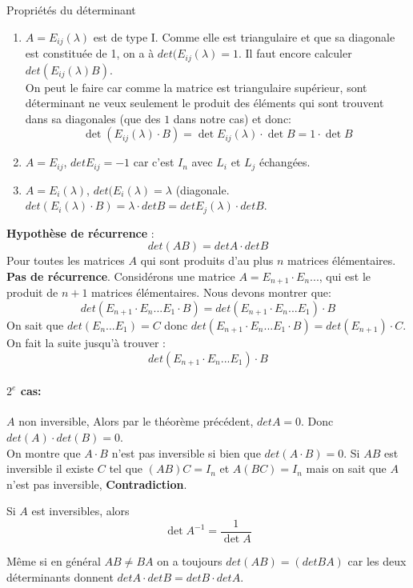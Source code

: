 \begin{parag}{Propriétés du déterminant}
\begin{preuve}
\begin{itemize}
        \end{itemize}
    \end{preuve}
    \begin{enumerate}
        \item $A = E_{ij}(\lambda)$ est de type I. Comme elle est triangulaire et que sa diagonale est constituée de 1, on a à $det(E_{ij}(\lambda) = 1$. Il faut encore calculer $det(E_{ij}(\lambda)B)$. \\ 
        On peut le faire car comme la matrice est triangulaire supérieur, sont déterminant ne veux seulement le produit des éléments qui sont trouvent dans sa diagonales (que des $1$ dans notre cas) et donc:
        \\ 
        \[\det(E_{ij}(\lambda)\cdot B) = \det E_{ij}(\lambda)\cdot \det B = 1 \cdot \det B\]
        \item $A = E_{ij}$, $det E_{ij} = -1$ car c'est $I_n$ avec $L_i$ et $L_j$ échangées.
        \item $A = E_i(\lambda)$, $det(E_i(\lambda) = \lambda$ (diagonale. $det(E_i(\lambda)\cdot B) = \lambda \cdot detB = det E_{j}(\lambda)\cdot det B$.


    \end{enumerate}
    \textbf{Hypothèse de récurrence} : \[ det(AB) = det A \cdot det B\]
    Pour toutes les matrices $A$ qui sont produits d'au plus $n$ matrices élémentaires.
    \\
    \textbf{Pas de récurrence}. Considérons une matrice $A = E_{n+1} \cdot E_n ...$, qui est le produit de $n + 1$ matrices élémentaires. Nous devons montrer que:
    \[
    det(E_{n+1}\cdot E_n ... E_1 \cdot B) =  det(E_{n+1}\cdot E_n ... E_1)\cdot B    \]
    On sait que $det( E_n ... E_1) = C$ donc $det(E_{n+1}\cdot E_n ... E_1 \cdot B) = det(E_{n+1}) \cdot C$.
    On fait la suite jusqu'à trouver : \[
    det(E_{n+1}\cdot E_n ... E_1)\cdot B
    \]

    \paragraph{$2^{e}$ cas: } $A$ non inversible, Alors par le théorème précédent, $det A = 0$. Donc $det(A) \cdot det(B) = 0$.\\
    On montre que $A\cdot B $ n'est pas inversible si bien que $det(A\cdot B) = 0$. Si $AB$ est inversible il existe $C$ tel que $(AB)C = I_n$ et $A(BC) = I_n$ mais on sait que $A$ n'est pas inversible, \textbf{Contradiction}.
    \\
    \begin{corollaire}
       Si $A$ est inversibles, alors
       \[\det A^{-1} = \frac{1}{\det A}\]
    \end{corollaire}  
    \begin{framedremark}
        Même si en général $AB \neq BA$ on a toujours $det(AB) = (detBA)$ car les deux déterminants donnent $det A \cdot det B = det B \cdot det A$.
    \end{framedremark}
    \begin{framedremark}
        

\end{framedremark}
\end{parag}
